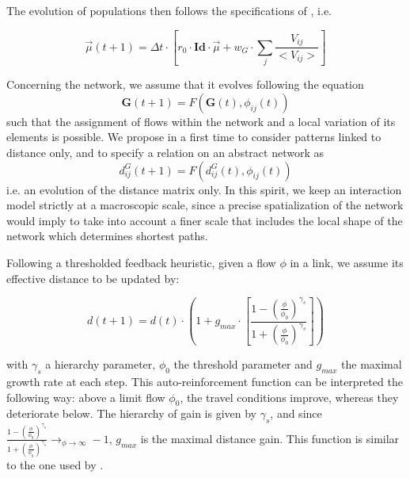 The evolution of populations then follows the specifications of \cite{raimbault2018indirect}, i.e.

\begin{equation}
\vec{\mu}(t+1)=\Delta t\cdot \left[ r_0\cdot \mathbf{Id}\cdot \vec{\mu} + w_G\cdot \sum_j \frac{V_{ij}}{<V_{ij}>}\right]
\end{equation}

Concerning the network, we assume that it evolves following the equation
\begin{equation}
\mathbf{G}(t + 1) = F(\mathbf{G}(t),\phi_{ij}(t))
\end{equation}
such that the assignment of flows within the network and a local variation of its elements is possible. We propose in a first time to consider patterns linked to distance only, and to specify a relation on an abstract network as
\begin{equation}
d^G_{ij}(t+1) = F(d^G_{ij}(t),\phi_{ij}(t))
\end{equation}
i.e. an evolution of the distance matrix only. In this spirit, we keep an interaction model strictly at a macroscopic scale, since a precise spatialization of the network would imply to take into account a finer scale that includes the local shape of the network which determines shortest paths.



Following a thresholded feedback heuristic, given a flow $\phi$ in a link, we assume its effective distance to be updated by:

\begin{equation}
d(t+1) = d(t)\cdot \left( 1 + g_{max} \cdot \left[\frac{1 - \left(\frac{\phi}{\phi_0}\right)^{\gamma_s}}{1 + \left(\frac{\phi}{\phi_0}\right)^{\gamma_s}}\right]\right)
\end{equation}

with $\gamma_s$ a hierarchy parameter, $\phi_0$ the threshold parameter and $g_{max}$ the maximal growth rate at each step. This auto-reinforcement function can be interpreted the following way: above a limit flow $\phi_0$, the travel conditions improve, whereas they deteriorate below. The hierarchy of gain is given by $\gamma_s$, and since $\frac{1 - \left(\frac{\phi}{\phi_0}\right)^{\gamma_s}}{1 + \left(\frac{\phi}{\phi_0}\right)^{\gamma_s}} \rightarrow_{\phi\rightarrow \infty} -1$, $g_{max}$ is the maximal distance gain. This function is similar to the one used by \cite{tero2007mathematical}.


